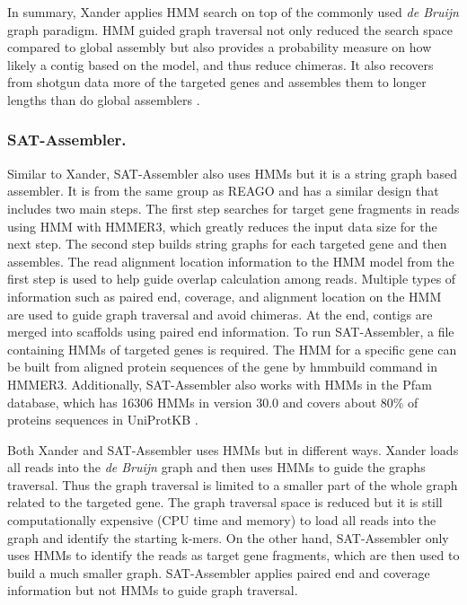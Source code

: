 \documentclass[]{msu-thesis}
\begin{document}
In summary, Xander applies HMM search on top of the commonly used
\textit{de Bruijn} graph paradigm. HMM guided graph traversal not only
reduced the search space compared to global assembly but also provides
a probability measure on how likely a contig based on the model, and
thus reduce chimeras. It also recovers from shotgun data more of the
targeted genes and assembles them to longer lengths than do global
assemblers \cite{wang_xander:_2015}.

\subsubsection{SAT-Assembler. }
Similar to Xander, SAT-Assembler also uses HMMs but it is a string graph
based assembler. It is from the same group as REAGO and has a similar
design that includes two main steps. The first step searches for
target gene fragments in reads using HMM with HMMER3, which greatly
reduces the input data size for the next step. The second step builds
string graphs for each targeted gene and then assembles. The read
alignment location information to the HMM model from the first step is
used to help guide overlap calculation among reads. Multiple types of
information such as paired end, coverage, and alignment location on
the HMM are used to guide graph traversal and avoid chimeras. At the end,
contigs are merged into scaffolds using paired end information.  To
run SAT-Assembler, a file containing HMMs of targeted genes is
required. The HMM for a specific gene can be built from aligned
protein sequences of the gene by hmmbuild command in
HMMER3. Additionally, SAT-Assembler also works with HMMs in the Pfam
database, which has 16306 HMMs in version 30.0 and covers about 80\%
of proteins sequences in UniProtKB 
\cite{finn_pfam_2016}.

Both Xander and SAT-Assembler uses HMMs but in different ways. Xander
loads all reads into the \textit{de Bruijn} graph and then uses HMMs
to guide the graphs traversal. Thus the graph traversal is limited to
a smaller part of the whole graph related to the targeted gene. The graph
traversal space is reduced but it is still computationally expensive (CPU
time and memory) to load all reads into the graph and identify the
starting k-mers.  On the other hand, SAT-Assembler
only uses HMMs to identify the reads as target gene fragments, which
are then used to build a much smaller graph.
SAT-Assembler applies paired end and coverage
information but not HMMs to guide graph traversal.
\end{document}
